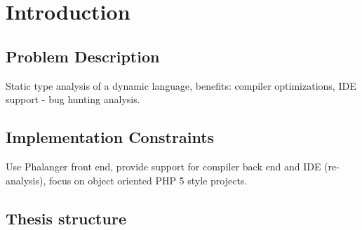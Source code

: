 \chapter{Introduction}

    \section{Problem Description}
    Static type analysis of a dynamic language, benefits: 
    compiler optimizations, IDE support - bug hunting analysis.

    \section{Implementation Constraints}
    Use Phalanger front end, provide support for compiler back end 
    and IDE (re-analysis), focus on object oriented PHP 5 style 
    projects.
    
    \section{Thesis structure}